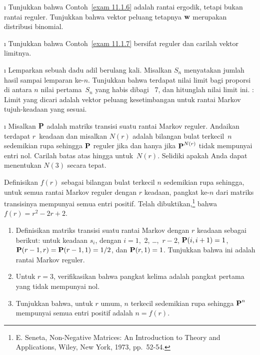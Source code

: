 \begin{LJSItem}
\i\label{exer 11.3.14} Tunjukkan bahwa Contoh~\ref{exam 11.1.6} adalah rantai
ergodik, tetapi bukan rantai reguler. Tunjukkan bahwa vektor peluang tetapnya
${\mbox{\bf w}\/}$ merupakan distribusi binomial.

\i\label{exer 11.3.15} Tunjukkan bahwa Contoh~\ref{exam 11.1.7} bersifat
reguler dan carilah vektor limitnya.

\i\label{exer 11.3.16} Lemparkan sebuah dadu adil berulang kali. Misalkan
$S_n$ menyatakan jumlah hasil sampai lemparan ke-$n$. Tunjukkan bahwa terdapat
nilai limit bagi proporsi di antara $n$ nilai pertama~$S_n$ yang habis dibagi
~7, dan hitunglah nilai limit ini. : Limit yang dicari adalah
vektor peluang kesetimbangan untuk rantai Markov tujuh-keadaan yang sesuai.

\i\label{exer 11.3.17} Misalkan ${\mbox{\bf P}\/}$ adalah matriks transisi suatu rantai
Markov reguler. Andaikan terdapat $r$~keadaan dan misalkan $N(r)$ adalah
bilangan bulat terkecil~$n$ sedemikian rupa sehingga ${\mbox{\bf P}\/}$ reguler jika dan
hanya jika ${\mbox{\bf P}\/}^{N(r)}$ tidak mempunyai entri nol. Carilah batas atas
hingga untuk~$N(r)$. Selidiki apakah Anda dapat menentukan $N(3)$ secara tepat.

\istar\label{exer 11.3.18} Definisikan $f(r)$ sebagai bilangan bulat terkecil
$n$ sedemikian rupa sehingga, untuk semua rantai Markov reguler dengan $r$
keadaan, pangkat ke-$n$ dari matriks transisinya mempunyai semua entri positif.
Telah dibuktikan,\footnote{E. Seneta, \emx
{Non-Negative Matrices:  An Introduction to Theory and Applications,}
Wiley, New York, 1973, pp.~52-54.}
bahwa $f(r) = r^2 - 2r + 2$.  
\begin{enumerate}
\item
Definisikan matriks transisi suatu rantai Markov dengan $r$ keadaan sebagai
berikut: untuk keadaan $s_i$, dengan $i = 1$,~2, \ldots,~$r - 2$, 
${\mbox{\bf P}\/}(i,i + 1) = 1$, ${\mbox{\bf P}\/}(r - 1,r) = {\mbox{\bf P}\/}(r - 1, 1) = 1/2$, dan 
${\mbox{\bf P}\/}(r,1) = 1$. Tunjukkan bahwa ini adalah rantai Markov reguler.

\item Untuk $r = 3$, verifikasikan bahwa pangkat kelima adalah pangkat pertama
yang tidak mempunyai nol.

\item Tunjukkan bahwa, untuk $r$ umum, $n$ terkecil sedemikian rupa sehingga
${\mbox{\bf P}\/}^n$ mempunyai semua entri positif adalah $n = f(r)$.
\end{enumerate}


\end{LJSItem}
